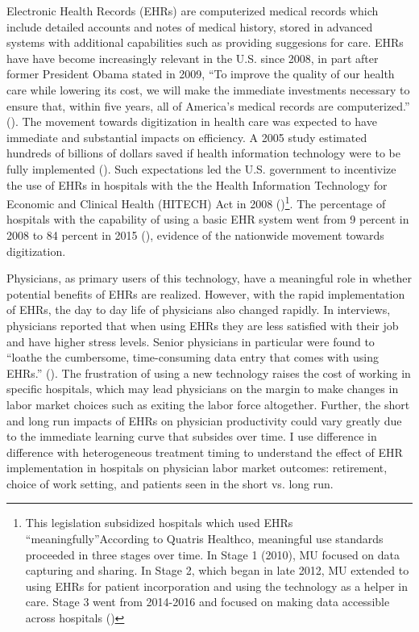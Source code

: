 \documentclass[11pt]{article}
\begin{document}
Electronic Health Records (EHRs) are computerized medical records which include detailed accounts and notes of medical history, stored in advanced systems with additional capabilities such as providing suggesions for care. EHRs have have become increasingly relevant in the U.S. since 2008, in part after former President Obama stated in 2009, “To improve the quality of our health care while lowering its cost, we will make the immediate investments necessary to ensure that, within five years, all of America’s medical records are computerized.” (\cite{presquote}). The movement towards digitization in health care was expected to have immediate and substantial impacts on efficiency. A 2005 study estimated hundreds of billions of dollars saved if health information technology were to be fully implemented (\cite{hillestad2005}). Such expectations led the U.S. government to incentivize the use of EHRs in hospitals with the the Health Information Technology for Economic and Clinical Health (HITECH) Act in 2008 (\cite{hitech})\footnote{This legislation subsidized hospitals which used EHRs “meaningfully”According to Quatris Healthco, meaningful use standards proceeded in three stages over time. In Stage 1 (2010), MU focused on data capturing and sharing. In Stage 2, which began in late 2012, MU extended to using EHRs for patient incorporation and using the technology as a helper in care. Stage 3 went from 2014-2016 and focused on making data accessible across hospitals (\cite{meanuse})}. The percentage of hospitals with the capability of using a basic EHR system went from 9 percent in 2008 to 84 percent in 2015 (\cite{stats}), evidence of the nationwide movement towards digitization.

Physicians, as primary users of this technology, have a meaningful role in whether potential benefits of EHRs are realized. However, with the rapid implementation of EHRs, the day to day life of physicians also changed rapidly. In interviews, physicians reported that when using EHRs they are less satisfied with their job and have higher stress levels. Senior physicians in particular were found to “loathe the cumbersome, time-consuming data entry that comes with using EHRs.” (\cite{CollierBurnout}). The frustration of using a new technology raises the cost of working in specific hospitals, which may lead physicians on the margin to make changes in labor market choices such as exiting the labor force altogether. Further, the short and long run impacts of EHRs on physician productivity could vary greatly due to the immediate learning curve that subsides over time.  I use difference in difference with heterogeneous treatment timing to understand the effect of EHR implementation in hospitals on physician labor market outcomes: retirement, choice of work setting, and patients seen in the short vs. long run.
\end{document}
